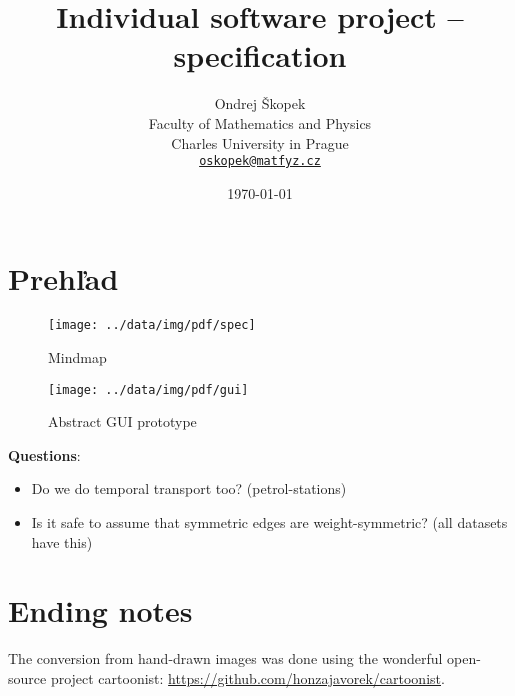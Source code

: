 \documentclass[12pt,a4paper,oneside]{article}
\author{Ondrej Škopek\\
Faculty of Mathematics and Physics\\
Charles University in Prague\\
\texttt{\href{mailto:oskopek@matfyz.cz}{oskopek@matfyz.cz}}}
\title{Individual software project -- specification}
\date{\today}
\begin{document}
\maketitle

\begin{abstract}
\end{abstract}

\section{Prehľad}

\FloatBarrier
\begin{figure}
        \centering
        \texttt{[image: ../data/img/pdf/spec]}
        \caption{Mindmap}
        \label{fig:mindmap}
\end{figure}
\begin{figure}
        \centering
        \texttt{[image: ../data/img/pdf/gui]}
        \caption{Abstract GUI prototype}
        \label{fig:gui}
\end{figure}

\FloatBarrier


\textbf{Questions}:
\begin{itemize}
    \item Do we do temporal transport too? (petrol-stations)
    \item Is it safe to assume that symmetric edges are weight-symmetric? (all datasets have this)
\end{itemize}


\section{Ending notes}
The conversion from hand-drawn images was done using the wonderful
open-source project cartoonist: \url{https://github.com/honzajavorek/cartoonist}.
\end{document}
